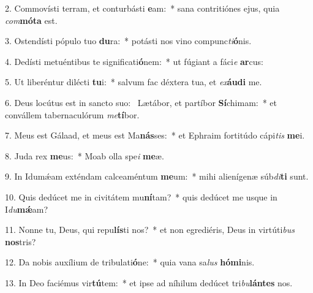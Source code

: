 2. Commovísti terram, et conturbásti \textbf{e}am:~*  sana contritiónes ejus, quia \textit{com}\textbf{mó}\textbf{ta} est.\

3. Ostendísti pópulo tuo \textbf{du}ra:~*  potásti nos vino compunc\textit{ti}\textbf{ó}nis.\

4. Dedísti metuéntibus te significati\textbf{ó}nem:~*  ut fúgiant a fáci\textit{e} \textbf{ar}cus:\

5. Ut liberéntur dilécti \textbf{tu}i:~*  salvum fac déxtera tua, et \textit{ex}\textbf{áu}\textbf{di} me.\

6. Deus locútus est in sancto suo: \dag\  Lætábor, et partíbor \textbf{Sí}chimam:~*  et convállem tabernaculórum \textit{me}\textbf{tí}bor.\

7. Meus est Gálaad, et meus est Ma\textbf{nás}ses:~*  et Ephraim fortitúdo cápi\textit{tis} \textbf{me}i.\

8. Juda rex \textbf{me}us:~*  Moab olla spe\textit{i} \textbf{me}æ.\

9. In Idumǽam exténdam calceaméntum \textbf{me}um:~*  mihi alienígenæ súb\textit{di}\textbf{ti} sunt.\

10. Quis dedúcet me in civitátem mu\textbf{ní}tam?~*  quis dedúcet me usque in I\textit{du}\textbf{mǽ}am?\

11. Nonne tu, Deus, qui repu\textbf{lís}ti nos?~*  et non egrediéris, Deus in virtúti\textit{bus} \textbf{nos}tris?\

12. Da nobis auxílium de tribulati\textbf{ó}ne:~*  quia vana sa\textit{lus} \textbf{hó}\textbf{mi}nis.\

13. In Deo faciémus vir\textbf{tú}tem:~*  et ipse ad níhilum dedúcet tri\textit{bu}\textbf{lán}\textbf{tes} nos.\


